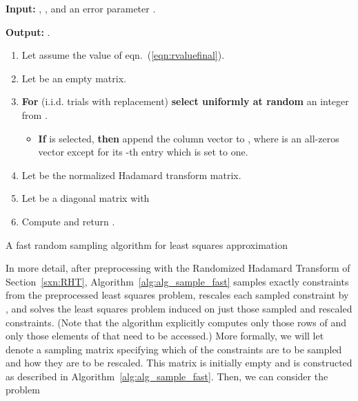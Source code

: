 \documentclass[11pt]{article}
\begin{document}
\begin{algorithm}[h]
\begin{framed}

\textbf{Input:} , , and an error parameter .

\vspace{0.1in}

\textbf{Output:} .

\begin{enumerate}

\item Let  assume the value of eqn.~(\ref{eqn:rvaluefinal}).

\item Let  be an empty matrix.

\item \textbf{For}  (i.i.d. trials with replacement) \textbf{select uniformly at random} an integer from .

\begin{itemize}

\item \textbf{If}  is selected, \textbf{then} append the column vector  to , where  is an all-zeros vector except for its -th entry which is set to one.

\end{itemize}

\item Let  be the normalized Hadamard transform
matrix.

\item Let  be a diagonal matrix with

\item
Compute and return .
\end{enumerate}

\end{framed}
\caption{A fast random sampling algorithm for least squares
approximation} \label{alg:alg_sample_fast}
\end{algorithm}


In more detail, after preprocessing with the Randomized Hadamard Transform of Section~\ref{sxn:RHT}, Algorithm~\ref{alg:alg_sample_fast} samples exactly  constraints from the preprocessed least squares problem, rescales each sampled constraint by , and solves the least squares problem induced on just those sampled and rescaled constraints. (Note that the algorithm explicitly computes only those rows of  and only those elements of  that need to be accessed.) More formally, we will let  denote a sampling matrix specifying which of the  constraints are to be sampled and how they are to be rescaled. This matrix is initially empty and is constructed as described in Algorithm~\ref{alg:alg_sample_fast}. Then, we can consider the problem
\end{document}
